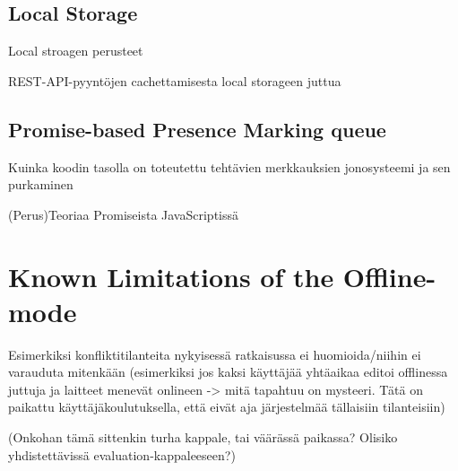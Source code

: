 \subsection{Local Storage}
Local stroagen perusteet

REST-API-pyyntöjen cachettamisesta local storageen juttua


\subsection{Promise-based Presence Marking queue}
Kuinka koodin tasolla on toteutettu tehtävien merkkauksien jonosysteemi ja sen purkaminen

(Perus)Teoriaa Promiseista JavaScriptissä


\section{Known Limitations of the Offline-mode}
Esimerkiksi konfliktitilanteita nykyisessä ratkaisussa ei huomioida/niihin ei varauduta mitenkään (esimerkiksi jos kaksi käyttäjää yhtäaikaa editoi offlinessa juttuja ja laitteet menevät onlineen -> mitä tapahtuu on mysteeri. Tätä on paikattu käyttäjäkoulutuksella, että eivät aja järjestelmää tällaisiin tilanteisiin)


(Onkohan tämä sittenkin turha kappale, tai väärässä paikassa? Olisiko yhdistettävissä evaluation-kappaleeseen?)

